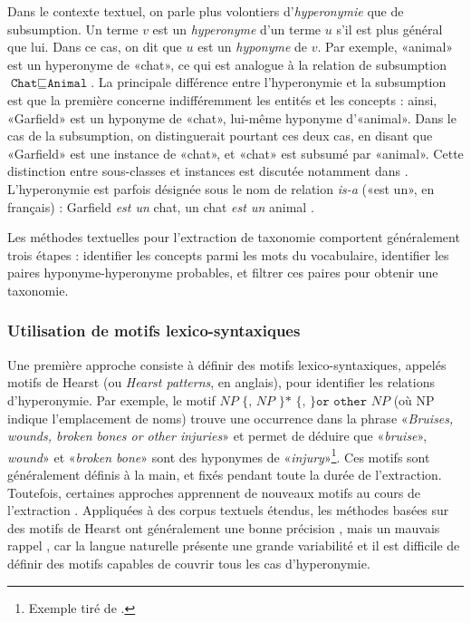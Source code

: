 
Dans le contexte textuel, on parle plus volontiers d'\textit{hyperonymie} que de subsumption. Un terme $v$ est un \textit{hyperonyme} d'un terme $u$ s'il est plus général que lui. Dans ce cas, on dit que $u$ est un \textit{hyponyme} de $v$. Par exemple, «animal» est un hyperonyme de «chat», ce qui est analogue à la relation de subsumption $\texttt{Chat} \sqsubseteq \texttt{Animal}$. La principale différence entre l'hyperonymie et la subsumption est que la première concerne indifféremment les entités et les concepts : ainsi, «Garfield» est un hyponyme de «chat», lui-même hyponyme d'«animal». Dans le cas de la subsumption, on distinguerait pourtant ces deux cas, en disant que «Garfield» est une instance de «chat», et «chat» est subsumé par «animal». Cette distinction entre sous-classes et instances est discutée notamment dans \cite{boleda2017instances}.
L'hyperonymie est parfois désignée sous le nom de relation \textit{is-a} («est un», en français) : Garfield \textit{est un} chat, un chat \textit{est un} animal \cite{camacho2018semeval}. 


Les méthodes textuelles pour l'extraction de taxonomie comportent généralement trois étapes : identifier les concepts parmi les mots du vocabulaire, identifier les paires hyponyme-hyperonyme probables, et filtrer ces paires pour obtenir une taxonomie.


\subsubsection{Utilisation de motifs lexico-syntaxiques}

Une première approche consiste à définir des motifs lexico-syntaxiques, appelés motifs de Hearst \cite{hearst1992automatic} (ou \textit{Hearst patterns}, en anglais), pour identifier les relations d'hyperonymie. Par exemple, le motif $NP \texttt{ \{, } NP \texttt{ \}* \{, \} or other } NP$ (où NP indique l'emplacement de noms) trouve une occurrence dans la phrase «\textit{Bruises, wounds, broken bones or other injuries}» et permet de déduire que «\textit{bruise}», \textit{wound}» et «\textit{broken bone}» sont des hyponymes de «\textit{injury}»\footnote{Exemple tiré de \cite{hearst1992automatic}.}.
Ces motifs sont généralement définis à la main, et fixés pendant toute la durée de l'extraction. Toutefois, certaines approches apprennent de nouveaux motifs au cours de l'extraction \cite{snow2005learning, shwartz-etal-2016-improving}. Appliquées à des corpus textuels étendus, les méthodes basées sur des motifs de Hearst ont généralement une bonne précision \cite{roller-etal-2018-hearst}, mais un mauvais rappel \cite{wu2008automatically}, car la langue naturelle présente une grande variabilité et il est difficile de définir des motifs capables de couvrir tous les cas d'hyperonymie.

